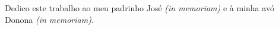 
Dedico este trabalho ao meu padrinho José \textit{(in memoriam)} e à minha avó Donona \textit{(in memoriam)}. 